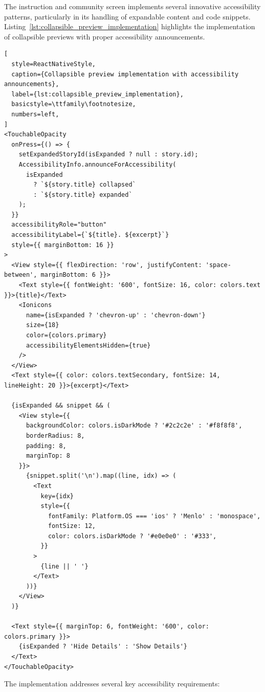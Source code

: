 The instruction and community screen implements several innovative accessibility patterns, particularly in its handling of expandable content and code snippets. Listing~\ref{lst:collapsible_preview_implementation} highlights the implementation of collapsible previews with proper accessibility announcements.

\begin{lstlisting}[
  style=ReactNativeStyle,
  caption={Collapsible preview implementation with accessibility announcements},
  label={lst:collapsible_preview_implementation},
  basicstyle=\ttfamily\footnotesize,
  numbers=left,
]
<TouchableOpacity
  onPress={() => {
    setExpandedStoryId(isExpanded ? null : story.id);
    AccessibilityInfo.announceForAccessibility(
      isExpanded 
        ? `${story.title} collapsed` 
        : `${story.title} expanded`
    );
  }}
  accessibilityRole="button"
  accessibilityLabel={`${title}. ${excerpt}`}
  style={{ marginBottom: 16 }}
>
  <View style={{ flexDirection: 'row', justifyContent: 'space-between', marginBottom: 6 }}>
    <Text style={{ fontWeight: '600', fontSize: 16, color: colors.text }}>{title}</Text>
    <Ionicons
      name={isExpanded ? 'chevron-up' : 'chevron-down'}
      size={18}
      color={colors.primary}
      accessibilityElementsHidden={true}
    />
  </View>
  <Text style={{ color: colors.textSecondary, fontSize: 14, lineHeight: 20 }}>{excerpt}</Text>

  {isExpanded && snippet && (
    <View style={{
      backgroundColor: colors.isDarkMode ? '#2c2c2e' : '#f8f8f8',
      borderRadius: 8,
      padding: 8,
      marginTop: 8
    }}>
      {snippet.split('\n').map((line, idx) => (
        <Text
          key={idx}
          style={{
            fontFamily: Platform.OS === 'ios' ? 'Menlo' : 'monospace',
            fontSize: 12,
            color: colors.isDarkMode ? '#e0e0e0' : '#333',
          }}
        >
          {line || ' '}
        </Text>
      ))}
    </View>
  )}

  <Text style={{ marginTop: 6, fontWeight: '600', color: colors.primary }}>
    {isExpanded ? 'Hide Details' : 'Show Details'}
  </Text>
</TouchableOpacity>
\end{lstlisting}
\FloatBarrier

The implementation addresses several key accessibility requirements:

